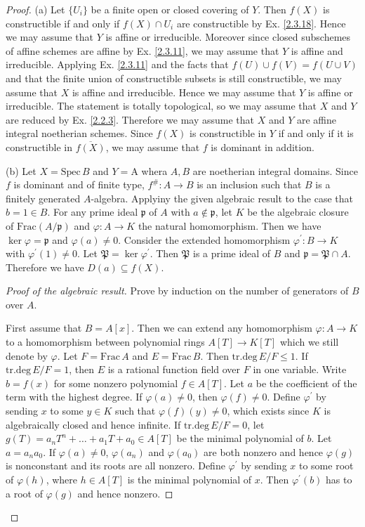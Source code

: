 \begin{proof}
	(a) Let $\{U_i\}$ be a finite open or closed covering of $Y$. Then $f(X)$ is constructible if and only if $f(X)\cap U_i$ are constructible by Ex. \ref{2.3.18}. Hence we may assume that $Y$ is affine or irreducible. Moreover since closed subschemes of affine schemes are affine by Ex. \ref{2.3.11}, we may assume that $Y$ is affine and irreducible. Applying Ex. \ref{2.3.11} and the facts that $f(U)\cup f(V)=f(U\cup V)$ and that the finite union of constructible subsets is still constructible, we may assume that $X$ is affine and irreducible. Hence we may assume that $Y$ is affine or irreducible. The statement is totally topological, so we may assume that $X$ and $Y$ are reduced by Ex. \ref{2.2.3}. Therefore we may assume that $X$ and $Y$ are affine integral noetherian schemes. Since $f(X)$ is constructible in $Y$ if and only if it is constructible in $\overline{f(X)}$, we may assume that $f$ is dominant in addition.
	
	(b) Let $X=\mathrm{Spec}\,B$ and $Y=\mathrm{A}$ whera $A,B$ are noetherian integral domains. Since $f$ is dominant and of finite type, $f^\#:A\to B$ is an inclusion such that $B$ is a finitely generated $A$-algebra. Applyiny the given algebraic result to the case that $b=1\in B$. For any prime ideal $\mathfrak{p}$ of $A$ with $a\notin\mathfrak{p}$, let $K$ be the algebraic closure of $\mathrm{Frac}(A/\mathfrak{p})$ and $\varphi:A\to K$ the natural homomorphism. Then we have $\ker\varphi=\mathfrak{p}$ and $\varphi(a)\neq0$. Consider the extended homomorphism $\varphi^{\prime}:B\to K$ with $\varphi^{\prime}(1)\neq 0$. Let $\mathfrak{P}=\ker\varphi^{\prime}$. Then $\mathfrak{P}$ is a prime ideal of $B$ and $\mathfrak{p}=\mathfrak{P}\cap A$. Therefore we have $D(a)\subseteq f(X)$.
	\begin{proof}[Proof of the algebraic result]
		Prove by induction on the number of generators of $B$ over $A$.
		
		First assume that $B=A[x]$. Then we can extend any homomorphism $\varphi:A\to K$ to a homomorphism between polynomial rings $A[T]\to K[T]$ which we still denote by $\varphi$. Let $F=\mathrm{Frac}\,A$ and $E=\mathrm{Frac}\,B$. Then $\mathrm{tr.deg}\,E/F\leq 1$. If $\mathrm{tr.deg}\,E/F=1$, then $E$ is a rational function field over $F$ in one variable. Write $b=f(x)$ for some nonzero polynomial $f\in A[T]$. Let $a$ be the coefficient of the term with the highest degree. If $\varphi(a)\neq0$, then $\varphi(f)\neq0$. Define $\varphi^{\prime}$ by sending $x$ to some $y\in K$ such that $\varphi(f)(y)\neq0$, which exists since $K$ is algebraically closed and hence infinite. If $\mathrm{tr.deg}\,E/F=0$, let $g(T)=a_nT^n+\dots+a_1T+a_0\in A[T]$ be the minimal polynomial of $b$. Let $a=a_na_0$. If $\varphi(a)\neq0$, $\varphi(a_n)$ and $\varphi(a_0)$ are both nonzero and hence $\varphi(g)$ is nonconstant and its roots are all nonzero. Define $\varphi^{\prime}$ by sending $x$ to some root of $\varphi(h)$, where $h\in A[T]$ is the minimal polynomial of $x$. Then $\varphi^{\prime}(b)$ has to a root of $\varphi(g)$ and hence nonzero.
		

\end{proof}
\end{proof}
